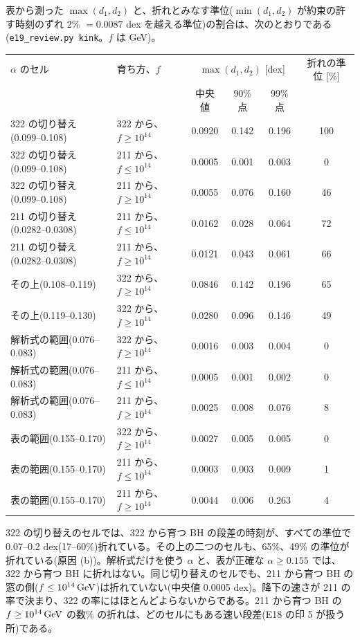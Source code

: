 表から測った $\max(d_1,d_2)$ と、折れとみなす準位($\min(d_1,d_2)$ が約束の許す時刻のずれ 2\% $=0.0087$ dex を越える準位)の割合は、次のとおりである(\texttt{e19\_review.py kink}。$f$ は GeV)。
\begin{center}\footnotesize
\begin{tabular}{llcccc}
\toprule
$\alpha$ のセル & 育ち方、$f$ & \multicolumn{3}{c}{$\max(d_1,d_2)$ [dex]} & 折れの準位 [\%]\\
 & & 中央値 & 90\% 点 & 99\% 点 & \\
\midrule
322 の切り替え(0.099--0.108) & 322 から、$f\ge10^{14}$ & 0.0920 & 0.142 & 0.196 & 100\\
322 の切り替え(0.099--0.108) & 211 から、$f\le10^{14}$ & 0.0005 & 0.001 & 0.003 & 0\\
322 の切り替え(0.099--0.108) & 211 から、$f\ge10^{14}$ & 0.0055 & 0.076 & 0.160 & 46\\
211 の切り替え(0.0282--0.0308) & 211 から、$f\le10^{14}$ & 0.0162 & 0.028 & 0.064 & 72\\
211 の切り替え(0.0282--0.0308) & 211 から、$f\ge10^{14}$ & 0.0121 & 0.043 & 0.061 & 66\\
その上(0.108--0.119) & 322 から、$f\ge10^{14}$ & 0.0846 & 0.142 & 0.196 & 65\\
その上(0.119--0.130) & 322 から、$f\ge10^{14}$ & 0.0280 & 0.096 & 0.146 & 49\\
解析式の範囲(0.076--0.083) & 322 から、$f\ge10^{14}$ & 0.0016 & 0.003 & 0.004 & 0\\
解析式の範囲(0.076--0.083) & 211 から、$f\le10^{14}$ & 0.0005 & 0.001 & 0.002 & 0\\
解析式の範囲(0.076--0.083) & 211 から、$f\ge10^{14}$ & 0.0025 & 0.008 & 0.076 & 8\\
表の範囲(0.155--0.170) & 322 から、$f\ge10^{14}$ & 0.0027 & 0.005 & 0.005 & 0\\
表の範囲(0.155--0.170) & 211 から、$f\le10^{14}$ & 0.0003 & 0.003 & 0.009 & 1\\
表の範囲(0.155--0.170) & 211 から、$f\ge10^{14}$ & 0.0044 & 0.006 & 0.263 & 4\\
\bottomrule
\end{tabular}
\end{center}
322 の切り替えのセルでは、322 から育つ BH の段差の時刻が、すべての準位で 0.07--0.2 dex(17--60\%)折れている。その上の二つのセルも、65\%、49\% の準位が折れている(原因 (b))。解析式だけを使う $\alpha$ と、表が正確な $\alpha\ge0.155$ では、322 から育つ BH に折れはない。同じ切り替えのセルでも、211 から育つ BH の窓の側($f\le10^{14}\,\mathrm{GeV}$)は折れていない(中央値 0.0005 dex)。降下の速さが 211 の率で決まり、322 の率にはほとんどよらないからである。211 から育つ BH の $f\ge10^{14}\,\mathrm{GeV}$ の数\% の折れは、どのセルにもある速い段差(E18 の印 5 が扱う所)である。

